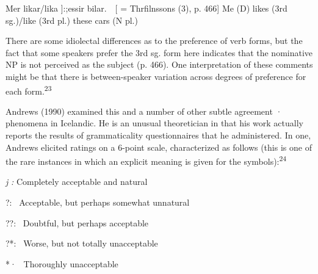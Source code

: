 \setcounter{listWWNumlixleveli}{7}
\begin{listWWNumlixleveli}
\item 
\begin{styleStandard}
Mer likar/lika ]:;essir bilar.\ \ [ = Thrfilnsson{\textquotesingle}s (3), p. 466] Me (D) likes (3rd sg.)/like (3rd pl.) these cars (N pl.)
\end{styleStandard}


\end{listWWNumlixleveli}
\begin{styleStandard}
{\textquotedbl}There are some idiolectal differences as to the preference of verb forms, but the fact that some speakers prefer the 3rd sg. form here indicates that the nominative NP is not perceived as the subject{\textquotedbl} (p. 466). One interpretation of these comments might be that there is between-speaker variation across degrees of preference for each form.\textsuperscript{23}
\end{styleStandard}


\begin{styleStandard}
Andrews (1990) examined this and a number of other subtle agreement · phenomena in Icelandic. He is an unusual theoretician in that his work actually reports the results of grammaticality questionnaires that he administered. In one, Andrews elicited ratings on a 6-point scale, characterized as follows (this is one of the rare instances in which an explicit meaning is given for the symbols):\textsuperscript{24}
\end{styleStandard}


\begin{styleStandard}
\textit{j}\textit{ }\textit{:}\textit{ }Completely acceptable and natural
\end{styleStandard}


\begin{styleStandard}
?: \ Acceptable, but perhaps somewhat unnatural
\end{styleStandard}


\begin{styleStandard}
??: \ Doubtful, but perhaps acceptable
\end{styleStandard}


\begin{styleStandard}
?*: \ Worse, but not totally unacceptable
\end{styleStandard}


\begin{styleStandard}
*· \ Thoroughly unacceptable
\end{styleStandard}


